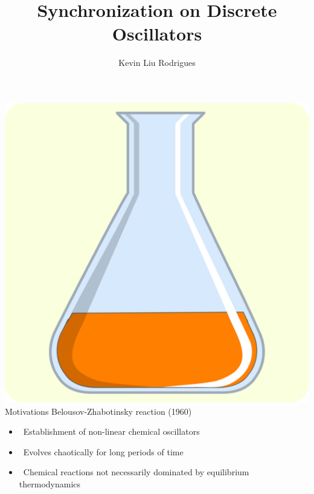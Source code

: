 \documentclass[serif,mathserif]{beamer}
\author[Kevin Liu Rodrigues]{Kevin Liu Rodrigues}
\title[frame \hspace{2em}\insertframenumber/\inserttotalframenumber]{Synchronization on Discrete Oscillators}
\institute{Federal University of Minas Gerais}
\begin{document}
\maketitle

\begin{frame}{\includegraphics[height=0.06\textheight]{erlenmeyer.eps}\hspace{0.25cm} Motivations}
    Belousov-Zhabotinsky reaction (1960)
    \begin{itemize}
        \item \ \pause Establishment of non-linear chemical oscillators
        \item \ \pause Evolves chaotically for long periods of time
        \item \ \pause Chemical reactions not necessarily dominated by equilibrium thermodynamics
    \end{itemize}
\end{frame}
\end{document}
